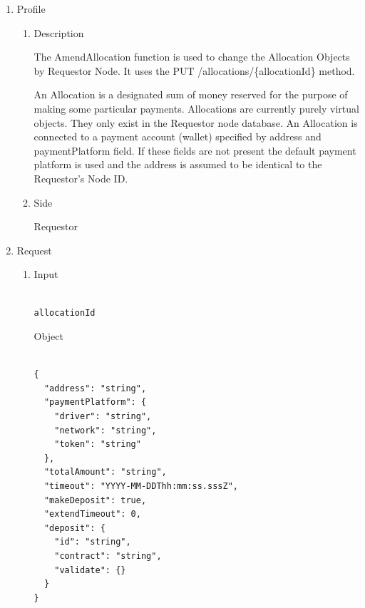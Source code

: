 \begin{enumerate}

\item Profile

\begin{enumerate}

\item Description

The AmendAllocation function is used to change the Allocation Objects by Requestor Node. 
It uses the PUT /allocations/\{allocationId\} method.

An Allocation is a designated sum of money reserved for the purpose of making some particular payments. 
Allocations are currently purely virtual objects. They only exist in the Requestor node database.
An Allocation is connected to a payment account (wallet) specified by address and paymentPlatform field. 
If these fields are not present the default payment platform is used and the address is assumed 
to be identical to the Requestor's Node ID.

 
\item Side

Requestor

\end{enumerate}

\item Request

\begin{enumerate}

\item Input

\begin{tcolorbox}[boxrule=0pt, frame empty]
\begin{verbatim}

allocationId

\end{verbatim}
\end{tcolorbox}

Object
\begin{tcolorbox}[boxrule=0pt, frame empty]
\begin{verbatim}

{
  "address": "string",
  "paymentPlatform": {
    "driver": "string",
    "network": "string",
    "token": "string"
  },
  "totalAmount": "string",
  "timeout": "YYYY-MM-DDThh:mm:ss.sssZ",
  "makeDeposit": true,
  "extendTimeout": 0,
  "deposit": {
    "id": "string",
    "contract": "string",
    "validate": {}
  }
}

\end{verbatim}
\end{tcolorbox}


\end{enumerate}
\end{enumerate}
